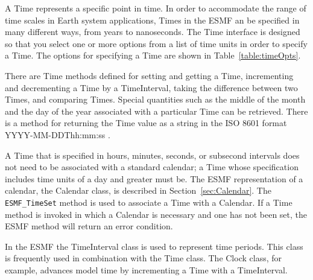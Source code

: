 \label{sec:Time}

A Time represents a specific point in time.  In order to accommodate
the range of time scales in Earth system applications, Times in
the ESMF an be specified in many different ways, from years to 
nanoseconds.  The Time interface is designed so that you select one or 
more options from a list of time units in order to specify a 
Time. The options for specifying a Time are shown in 
Table~\ref{table:timeOpts}.  

There are Time methods defined for setting and getting a
Time, incrementing and decrementing a Time by a TimeInterval,
taking the difference between two Times, and comparing Times.
Special quantities such as the middle of the month and the 
day of the year associated with a particular Time can be retrieved. 
There is a method for returning the Time value as a string in 
the ISO 8601 format YYYY-MM-DDThh:mm:ss \cite{ISO}.

A Time that is specified in hours, minutes, seconds, or subsecond intervals 
does not need to be associated with a standard calendar; a Time whose
specification includes time units of a day and greater must be.  The 
ESMF representation
of a calendar, the Calendar class, is described in Section~\ref{sec:Calendar}.
The {\tt ESMF\_TimeSet} method is used to associate a Time with a 
Calendar.  If a Time method is invoked in which a Calendar is 
necessary and one has not been set, the ESMF method will return an error
condition.

In the ESMF the TimeInterval class is used to represent time periods.
This class is frequently used in combination with the Time class.
The Clock class, for example, advances model time by incrementing a
Time with a TimeInterval. 
 




